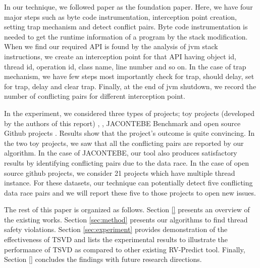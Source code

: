 In our technique, we followed \cite{li2019efficient} paper as the foundation
paper. Here, we have four major steps such as byte code instrumentation,
interception point creation, setting trap mechanism and detect conflict pairs.
Byte code instrumentation is needed to get the runtime information of a program
by the stack modification. When we find our required API is found by the
analysis of jvm stack instructions, we create an interception point for that
API having object id, thread id, operation id, class name, line number and so
on. In the case of trap mechanism, we have few steps most importantly check for
trap, should delay, set for trap, delay and clear trap. Finally, at the end of
jvm shutdown, we record the number of conflicting pairs for different
interception point.

In the experiment, we considered three types of projects; toy projects
(developed by the authors of this report) \cite{toy_project_1},
\cite{toy_project_2}, JACONTEBE Benchmark \cite{lin2015jacontebe} and open
source Github projects \cite{githubProjects}. Results show that the project's
outcome is quite convincing. In the two toy projects, we saw that all the
conflicting pairs are reported by our algorithm. In the case of JACONTEBE, our
tool also produces satisfactory results by identifying conflicting pairs due to
the data race. In the case of open source github projects, we consider 21
projects which have multiple thread instance. For these datasets,  our technique
can potentially detect five conflicting data race pairs and we will report
these five to those projects to open new issues.


The rest of this paper is organized as follows. Section \ref{} presents an overview
of the existing works. Section \ref{sec:method} presents our algorithms to find thread safety violations. Section \ref{sec:experiment}
provides demonstration of the effectiveness of TSVD and lists the experimental
results to illustrate the performance of TSVD as compared to other existing
RV-Predict tool. Finally, Section \ref{} concludes the findings with future research directions.






